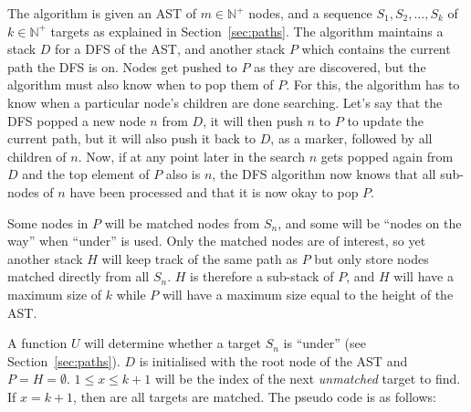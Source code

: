 \documentclass[a4paper,12pt]{article}
\newcommand{\elnaturale}{\mathbb{N}}
\begin{document}
The algorithm is given an
AST of $m \in \elnaturale^+$ nodes, and a sequence $S_1, S_2, \dots, S_k$ of $k \in \elnaturale^+$ targets as
explained in Section~\ref{sec:paths}. The algorithm maintains a stack $D$ for a DFS of the
AST, and another stack $P$ which contains the current path the DFS is on. Nodes get pushed
to $P$ as they are discovered, but the algorithm must also know when to pop them of $P$. For this,
the algorithm
has to know when a particular node's children are done searching. Let's say that the DFS
popped a new node $n$ from $D$, it will then push $n$ to $P$ to update the current path, but it will
also push it back to $D$, as a marker, followed by all children of $n$. Now, if at any point later in
the search $n$ gets popped again from $D$ and the top element of $P$ also is $n$, the DFS
algorithm now knows that all sub-nodes of $n$ have been processed and that it is now okay to pop $P$.

Some nodes in $P$ will be matched nodes from $S_n$, and some will be ``nodes on the way''
when ``under'' is used. Only the matched nodes are of interest, so yet another stack $H$
will keep track of the same path as $P$ but only store nodes matched directly from all $S_n$.
$H$ is therefore a sub-stack of $P$, and
$H$ will have a maximum size of $k$ while $P$ will have a maximum size equal to
the height of the AST.

A function $U$
will determine whether a target $S_n$ is ``under'' (see Section~\ref{sec:paths}). $D$ is
initialised with the root node of the AST and $P = H = \emptyset$. $1 \leq x \leq k+1$ will be the index of
the next \emph{unmatched} target to find. If $x = k+1$, then are all targets are matched.
The pseudo code is as follows:
\end{document}

